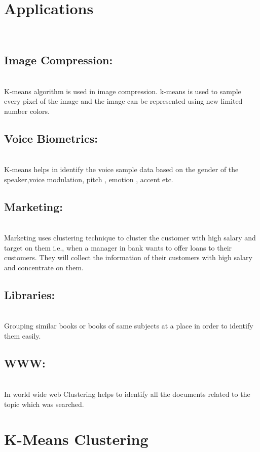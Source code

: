 \documentclass[11pt]{article}
\begin{document}
\section{Applications}\\

\subsection{Image Compression:}\\ K-means algorithm is used in image compression. k-means is used to sample every pixel of the image and the image can be represented using new limited number colors.

\subsection{Voice Biometrics:}\\ K-means helps in identify the voice sample data based on the gender of the speaker,voice modulation, pitch , emotion , accent etc.

\subsection{Marketing:}\\ Marketing uses clustering technique to cluster the customer with high salary and target on them i.e., when a manager in bank wants to offer loans to their customers. They will collect the information of their customers with high salary and concentrate on them.

\subsection{Libraries:}\\ Grouping similar books or books of same subjects at a place in order to identify them easily.

\subsection{WWW:}\\ In world wide web Clustering helps to identify all the documents related to the topic which was searched.
\\

\section{K-Means Clustering}\\
\end{document}
